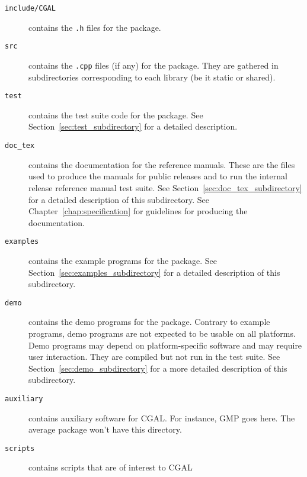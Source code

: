 \begin{description}
  \item[{\tt include/CGAL}]
       contains the {\tt .h} files for the package.
  \item[{\tt src}]
       contains the {\tt .cpp} files (if any) for the package.
       They are gathered in subdirectories corresponding to each
       library (be it static or shared).
     \item[{\tt test}] contains the test suite code for the package. See
       Section~\ref{sec:test_subdirectory} for a detailed description.
  \item[{\tt doc\_tex}]
       contains the documentation for the reference manuals.
       These are the files used to produce the manuals for public releases and
       to run the internal release reference manual test suite.
       See Section~\ref{sec:doc_tex_subdirectory} for a detailed description 
       of this subdirectory.
       See Chapter~\ref{chap:specification} for guidelines for producing
       the documentation.
  \item[{\tt examples}]
       contains the example programs for the package.
       See Section~\ref{sec:examples_subdirectory} for a detailed 
       description of this subdirectory.
  \item[{\tt demo}]
       contains the demo programs for the package.
       Contrary to example programs, demo programs are not expected to be
       usable on all platforms. Demo programs may depend on platform-specific
       software and may require user interaction.  They are compiled but not
       run in the test suite. See Section~\ref{sec:demo_subdirectory} for a
       more detailed description of this subdirectory.
     \item[{\tt auxiliary}] contains auxiliary software for CGAL. For
       instance, GMP goes here. The average package won't have this
       directory.
     \item[{\tt scripts}] contains scripts that are of interest to CGAL

\end{description}
